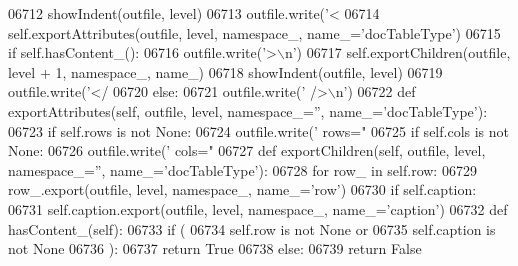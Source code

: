 \begin{DoxyCode}
{{{{{{{{{{{{{{{{{{{{{{{{{{{{{{{{{{{{{{{{{{{{{{{{{{{{{{{{{{{{{{{{{{{{{{{{{{{{{{{{{{{{{{{{{{{{{{{{{{{{{{{{{{{{{{{{{{{{{{{{{{{{{{{{{{{{{{{{{{{{{{{{{{{{{{{{{{{{{{{{{{{{{{{{{{{{{{{{{{{{{{{{{{{{{{{{{{{{{{{{{{{{{{{{{{{{{{{{{{{{{{{{{{{{{{{{{{{{{{{{{{{{{{{{{{{{{{{{{{{{{{{{{{{{{{{{{{{{{{{{{{{{{{{{{{{{{{{{{{{{{{{{{{{{{{{{{{{{{{{{{{{{{{{{{{{{{{{{{{{{{{{{{{{{{{{{{{{{{{{{{{{{{{{{{{{{{{{{{{{{{{{{{{{{{{{{{{{{{{{{{{{{{{{{{{{{{{06712         showIndent(outfile, level)
06713         outfile.write(\textcolor{stringliteral}{'<%
06714         self.exportAttributes(outfile, level, namespace\_, name\_=\textcolor{stringliteral}{'docTableType'})
06715         \textcolor{keywordflow}{if} self.hasContent_():
06716             outfile.write(\textcolor{stringliteral}{'>\(\backslash\)n'})
06717             self.exportChildren(outfile, level + 1, namespace\_, name\_)
06718             showIndent(outfile, level)
06719             outfile.write(\textcolor{stringliteral}{'</%
06720         \textcolor{keywordflow}{else}:
06721             outfile.write(\textcolor{stringliteral}{' />\(\backslash\)n'})
06722     \textcolor{keyword}{def }exportAttributes(self, outfile, level, namespace\_='', name\_='docTableType'):
06723         \textcolor{keywordflow}{if} self.rows \textcolor{keywordflow}{is} \textcolor{keywordflow}{not} \textcolor{keywordtype}{None}:
06724             outfile.write(\textcolor{stringliteral}{' rows="%
06725         \textcolor{keywordflow}{if} self.cols \textcolor{keywordflow}{is} \textcolor{keywordflow}{not} \textcolor{keywordtype}{None}:
06726             outfile.write(\textcolor{stringliteral}{' cols="%
06727     \textcolor{keyword}{def }exportChildren(self, outfile, level, namespace\_='', name\_='docTableType'):
06728         \textcolor{keywordflow}{for} row\_ \textcolor{keywordflow}{in} self.row:
06729             row\_.export(outfile, level, namespace\_, name\_=\textcolor{stringliteral}{'row'})
06730         \textcolor{keywordflow}{if} self.caption:
06731             self.caption.export(outfile, level, namespace\_, name\_=\textcolor{stringliteral}{'caption'})
06732     \textcolor{keyword}{def }hasContent_(self):
06733         \textcolor{keywordflow}{if} (
06734             self.row \textcolor{keywordflow}{is} \textcolor{keywordflow}{not} \textcolor{keywordtype}{None} \textcolor{keywordflow}{or}
06735             self.caption \textcolor{keywordflow}{is} \textcolor{keywordflow}{not} \textcolor{keywordtype}{None}
06736             ):
06737             \textcolor{keywordflow}{return} \textcolor{keyword}{True}
06738         \textcolor{keywordflow}{else}:
06739             \textcolor{keywordflow}{return} \textcolor{keyword}{False}
}}}}}}}}}}}}}}}}}}}}}}}}}}}}}}}}}}}}}}}}}}}}}}}}}}}}}}}}}}}}}}}}}}}}}}}}}}}}}}}}}}}}}}}}}}}}}}}}}}}}}}}}}}}}}}}}}}}}}}}}}}}}}}}}}}}}}}}}}}}}}}}}}}}}}}}}}}}}}}}}}}}}}}}}}}}}}}}}}}}}}}}}}}}}}}}}}}}}}}}}}}}}}}}}}}}}}}}}}}}}}}}}}}}}}}}}}}}}}}}}}}}}}}}}}}}}}}}}}}}}}}}}}}}}}}}}}}}}}}}}}}}}}}}}}}}}}}}}}}}}}}}}}}}}}}}}}}}}}}}}}}}}}}}}}}}}}}}}}}}}}}}}}}}}}}}}}}}}}}}}}}}}}}}}}}}}}}}}}}}}}}}}}}}}}}}}}}}}}}}}}}}}}}}}}}}}}}}}}}
\end{DoxyCode}
